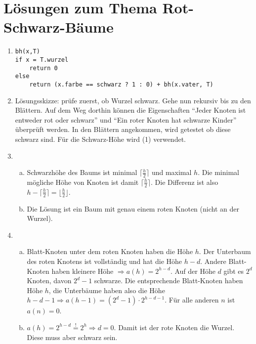 \documentclass{scrartcl}
\begin{document}
\section*{Lösungen zum Thema Rot-Schwarz-Bäume}
\begin{enumerate}[(1)]

\item \begin{verbatim}
bh(x,T)
if x = T.wurzel
    return 0
else
    return (x.farbe == schwarz ? 1 : 0) + bh(x.vater, T)
\end{verbatim}

\item L\"osungsskizze: pr\"ufe zuerst, ob Wurzel schwarz. Gehe nun rekursiv bis zu den Bl\"attern. Auf dem Weg dorthin k\"onnen die Eigenschaften "`Jeder Knoten ist entweder rot oder schwarz"' und "`Ein roter Knoten hat schwarze Kinder"' \"uberpr\"uft werden. In den Bl\"attern angekommen, wird getestet ob diese schwarz sind. F\"ur die Schwarz-H\"ohe wird (1) verwendet.

\item \begin{enumerate}[(a)]
\item Schwarzh\"ohe des Baums ist minimal $\lceil\frac{h}{2}\rceil$ und maximal $h$. Die minimal m\"ogliche H\"ohe von Knoten ist damit $\lceil\frac{h}{2}\rceil$. Die Differenz ist also $h-\lceil\frac{h}{2}\rceil=\lfloor\frac{h}{2}\rfloor$.
\item Die L\"osung ist ein Baum mit genau einem roten Knoten (nicht an der Wurzel).
\end{enumerate}

\item \begin{enumerate}[(a)]
\item Blatt-Knoten unter dem roten Knoten haben die H\"ohe $h$. Der Unterbaum des roten Knotens ist vollst\"andig und hat die H\"ohe $h-d$. Andere Blatt-Knoten haben kleinere H\"ohe $\Rightarrow a(h)=2^{h-d}$.\newline
Auf der H\"ohe $d$ gibt es $2^d$ Knoten, davon $2^d-1$ schwarze. Die entsprechende Blatt-Knoten haben H\"ohe $h$, die Unterb\"aume haben also die H\"ohe $h-d-1 \Rightarrow a(h-1)=(2^d-1)\cdot 2^{h-d-1}$.\newline
F\"ur alle anderen $n$ ist $a(n) =0$.
\item $a(h)=2^{h-d}\stackrel{!}{=}2^h\Rightarrow d=0$. Damit ist der rote Knoten die Wurzel. Diese muss aber schwarz sein.
\end{enumerate}

\end{enumerate}
\end{document}
